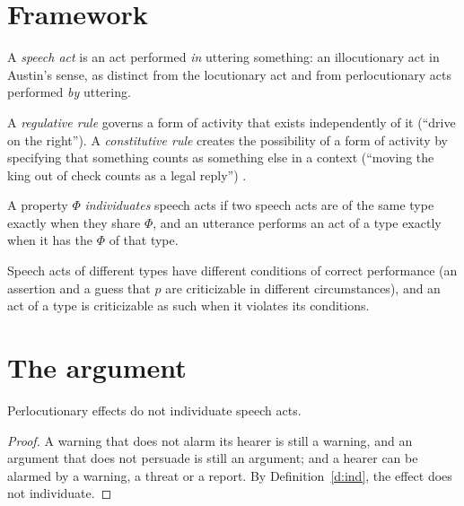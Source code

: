 \documentclass{situationist-preprint}
\begin{document}
\section{Framework}

\begin{definition}\label{d:sa}
A \emph{speech act} is an act performed \emph{in} uttering something: an illocutionary act in Austin's sense, as distinct from the locutionary act and from perlocutionary acts performed \emph{by} uttering.
\end{definition}

\begin{definition}\label{d:rules}
A \emph{regulative rule} governs a form of activity that exists independently of it (\enquote{drive on the right}). A \emph{constitutive rule} creates the possibility of a form of activity by specifying that something counts as something else in a context (\enquote{moving the king out of check counts as a legal reply}) \citep{Rawls1955,Searle1969}.
\end{definition}

\begin{definition}[Individuation]\label{d:ind}
A property $\Phi$ \emph{individuates} speech acts if two speech acts are of the same type exactly when they share $\Phi$, and an utterance performs an act of a type exactly when it has the $\Phi$ of that type.
\end{definition}

\begin{assumption}[Correctness]\label{a:correct}
Speech acts of different types have different conditions of correct performance (an assertion and a guess that $p$ are criticizable in different circumstances), and an act of a type is criticizable as such when it violates its conditions.
\end{assumption}

\section{The argument}

\begin{lemma}\label{l:perl}
Perlocutionary effects do not individuate speech acts.
\end{lemma}

\begin{proof}
A warning that does not alarm its hearer is still a warning, and an argument that does not persuade is still an argument; and a hearer can be alarmed by a warning, a threat or a report. By Definition~\ref{d:ind}, the effect does not individuate.
\end{proof}
\end{document}
